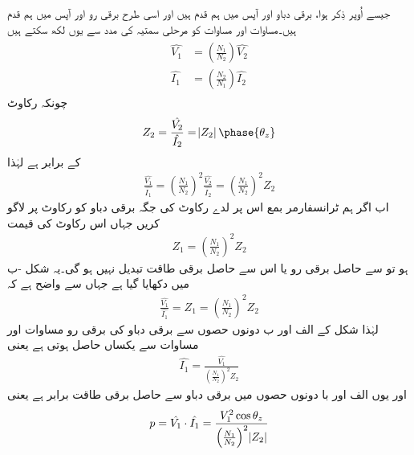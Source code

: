 جیسے اُوپر ذِکر ہوا، برقی دباو  اور  آپس میں ہم قدم ہیں اور  اسی طرح برقی رو  اور  آپس میں  ہم قدم ہیں۔مساوات  اور  مساوات    کو مرحلی سمتیہ کی مدد سے یوں لکھ سکتے ہیں
\begin{gather}
\begin{aligned}
\hat{V_1}&=\left(\frac{N_1}{N_2} \right) \hat{V_2}\\
\hat{I_1}&=\left(\frac{N_2}{N_1} \right) \hat{I_2}
\end{aligned}
\end{gather}
چونکہ رکاوٹ
\begin{align}
Z_2=\frac{\hat{V_2}}{\hat{I_2}}=\abs{Z_2}\phase{\theta_z}
\end{align}
کے برابر ہے لہٰذا
\begin{align}\label{مساوات_ٹرانسفارمر_تبادلہ_رکاوٹ_الف}
\frac{\hat{V_1}}{\hat{I_1}}=\left(\frac{N_1}{N_2} \right)^2 \frac{\hat{V_2}}{\hat{I_2}}=\left(\frac{N_1}{N_2} \right)^2  Z_2
\end{align}
اب اگر ہم ٹرانسفارمر بمع اس پر لدے رکاوٹ  کی جگہ برقی دباو  کو رکاوٹ  پر لاگو کریں جہاں اس رکاوٹ کی قیمت
\begin{align}\label{مساوات_ٹرانسفارمر_متبادل_رکاوٹ_تعریف}
Z_1=\left(\frac{N_1}{N_2} \right)^2  Z_2
\end{align}
ہو تو  سے حاصل برقی رو یا اس سے حاصل برقی طاقت تبدیل نہیں ہو گی۔یہ شکل -ب میں دکھایا گیا ہے جہاں سے واضح ہے کہ
\begin{align}\label{مساوات_ٹرانسفارمر_تبادلہ_رکاوٹ_ب}
\frac{\hat{V_1}}{\hat{I_1}}=Z_1=\left(\frac{N_1}{N_2} \right)^2  Z_2
\end{align}
لہٰذا شکل کے الف اور ب دونوں حصوں سے  برقی دباو  کی برقی رو مساوات   اور مساوات   سے یکساں حاصل ہوتی ہے یعنی
\begin{align}
\hat{I_1}=\frac{\hat{V_1}}{\left(\frac{N_1}{N_2} \right)^2  Z_2}
\end{align}
اور یوں الف اور با  دونوں حصوں میں  برقی دباو  سے حاصل برقی طاقت برابر ہے یعنی
\begin{align}
p=\hat{V_1} \cdot \hat{I_1}=\frac{V_1^2 \cos \theta_z}{\left(\frac{N_1}{N_2} \right)^2  \abs{Z_2}}
\end{align}
%
